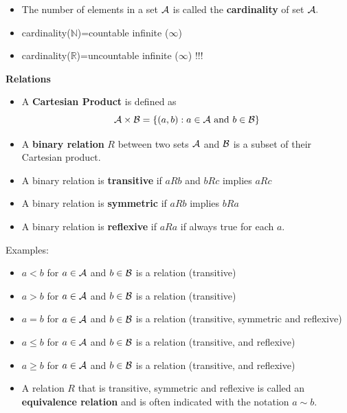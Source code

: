 \documentclass[justified, sixbynine]{tufte-book}
\def\subsubsection#1{{\bf #1}}
\theoremstyle{plain}%
\newtheorem * {corollary}{Corollary}
\theoremstyle{definition}
\theoremstyle{remark}
\newtheorem * {remark}{Remark}
\newtheorem * {note}{Note}
\begin{document}
\begin{fullwidth}
\begin{itemize}
\item  The number of elements in a set ${\cal A}$ is called the {\bf %
cardinality} of set ${\cal A}.$

\item  cardinality($\mathbb{N}$)=countable infinite ($\infty $)

\item  cardinality($\mathbb{R}$)=uncountable infinite ($\infty $) !!!
\end{itemize}


\subsubsection{Relations}

\begin{itemize}
\item  A {\bf Cartesian Product} is defined as
\begin{equation}
{\cal A}\times {\cal B}=\{(a, b):a\in {\cal A}\text{ and }b\in {\cal B}\}
\end{equation}

\item  A {\bf binary relation} $R$ between two sets ${\cal A}$ and ${\cal B}$
is a subset of their Cartesian product.

\item  A binary relation is {\bf transitive} if $aRb$ and $bRc$ implies $aRc$

\item  A binary relation is {\bf symmetric} if $aRb$ implies $bRa$

\item  A binary relation is {\bf reflexive} if $aRa$ if always true for each
$a.$
\end{itemize}

Examples:

\begin{itemize}
\item
$a<b$ for $a\in {\cal A}$ and $b\in {\cal B}$ is a relation (transitive)
\item
$a>b$ for $a\in {\cal A}$ and $b\in {\cal B}$ is a relation (transitive)
\item
$a=b$ for $a\in {\cal A}$ and $b\in {\cal B}$ is a relation (transitive, 
symmetric and reflexive)
\item
$a\leq b$ for $a\in {\cal A}$ and $b\in {\cal B}$ is a relation (transitive, 
and reflexive)
\item
$a\geq b$ for $a\in {\cal A}$ and $b\in {\cal B}$ is a relation (transitive, 
and reflexive)
\item  A relation $R$ that is transitive, symmetric and reflexive is called
an {\bf equivalence relation} and is often indicated with the notation $a\sim b$.
\end{itemize}


\end{fullwidth}
\end{document}
